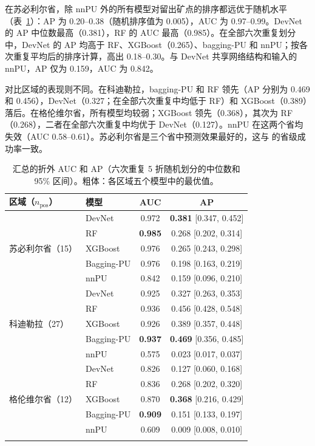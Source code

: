\documentclass[pdflatex,sn-apa]{sn-jnl}
\begin{document}
在苏必利尔省，除 nnPU 外的所有模型对留出矿点的排序都远优于随机水平（表~\ref{tab:benchmark}）：AP 为 0.20--0.38（随机排序值为 0.005），AUC 为 0.97--0.99。DevNet 的 AP 中位数最高（0.381），RF 的 AUC 最高（0.985）。在全部六次重复划分中，DevNet 的 AP 均高于 RF、XGBoost（0.265）、bagging-PU 和 nnPU；按各次重复平均后的排序计算，高出 0.18--0.30。与 DevNet 共享网络结构和输入的 nnPU，AP 仅为 0.159，AUC 为 0.842。

对比区域的表现则不同。在科迪勒拉，bagging-PU 和 RF 领先（AP 分别为 0.469 和 0.456），DevNet（0.327；在全部六次重复中均低于 RF）和 XGBoost（0.389）落后。在格伦维尔省，所有模型均较弱；XGBoost 领先（0.368），其次为 RF（0.268），二者在全部六次重复中均优于 DevNet（0.127）。nnPU 在这两个省均失效（AUC 0.58--0.61）。苏必利尔省是三个省中预测效果最好的，这与 \citet{Parsa2024} 的省级成功率一致。

\begin{table}[t]
\caption{汇总的折外 AUC 和 AP（六次重复 5 折随机划分的中位数和 95\% 区间）。粗体：各区域五个模型中的最优值。}\label{tab:benchmark}
\footnotesize
\begin{tabular*}{\textwidth}{@{\extracolsep\fill}llcc}
\toprule
区域（$n_{\mathrm{pos}}$） & 模型 & AUC & AP \\
\midrule
\multirow{5}{*}{苏必利尔省（15）} & DevNet & 0.972 & \textbf{0.381} [0.347, 0.452] \\
 & RF & \textbf{0.985} & 0.268 [0.202, 0.314] \\
 & XGBoost & 0.976 & 0.265 [0.243, 0.298] \\
 & Bagging-PU & 0.976 & 0.198 [0.163, 0.219] \\
 & nnPU & 0.842 & 0.159 [0.096, 0.210] \\
\midrule
\multirow{5}{*}{科迪勒拉（27）} & DevNet & 0.925 & 0.327 [0.263, 0.353] \\
 & RF & 0.936 & 0.456 [0.428, 0.548] \\
 & XGBoost & 0.926 & 0.389 [0.357, 0.448] \\
 & Bagging-PU & \textbf{0.937} & \textbf{0.469} [0.356, 0.485] \\
 & nnPU & 0.575 & 0.023 [0.017, 0.037] \\
\midrule
\multirow{5}{*}{格伦维尔省（12）} & DevNet & 0.826 & 0.127 [0.060, 0.168] \\
 & RF & 0.836 & 0.268 [0.202, 0.320] \\
 & XGBoost & 0.870 & \textbf{0.368} [0.216, 0.429] \\
 & Bagging-PU & \textbf{0.909} & 0.151 [0.133, 0.197] \\
 & nnPU & 0.609 & 0.009 [0.008, 0.010] \\
\botrule
\end{tabular*}
\end{table}
\end{document}
